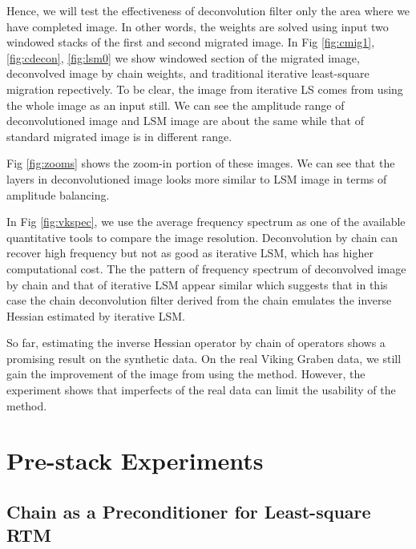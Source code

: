 %
Hence, we will test the effectiveness of deconvolution filter only the area where we have completed image. In other words, the weights are solved using input two windowed stacks of the first and second migrated image. In Fig \ref{fig:cmig1}, \ref{fig:cdecon}, \ref{fig:lsm0} we show windowed section of the migrated image, deconvolved image by chain weights, and traditional iterative least-square migration repectively. To be clear, the image from iterative LS comes from using the whole image as an input still. We can see the amplitude range of deconvolutioned image and LSM image are about the same while that of standard migrated image is in different range.  



Fig \ref{fig:zooms} shows the zoom-in portion of these images. We can see that the layers in deconvolutioned image looks more similar to LSM image in terms of amplitude balancing.


In Fig \ref{fig:vkspec}, we use the average frequency spectrum as one of the available quantitative tools to compare the image resolution. Deconvolution by chain can recover high frequency but not as good as iterative LSM, which has higher computational cost. The the pattern of frequency spectrum of deconvolved image by chain and that of iterative LSM appear similar which suggests that in this case the chain deconvolution filter derived from the chain emulates the inverse Hessian estimated by iterative LSM.


So far, estimating the inverse Hessian operator by chain of operators shows a promising result on the synthetic data. On the real Viking Graben data, we still gain the improvement of the image from using the method. However, the experiment shows that imperfects of the real data can limit the usability of the method.


%
%
\newpage
\section{Pre-stack Experiments}
\subsection{Chain as a Preconditioner for Least-square RTM}


